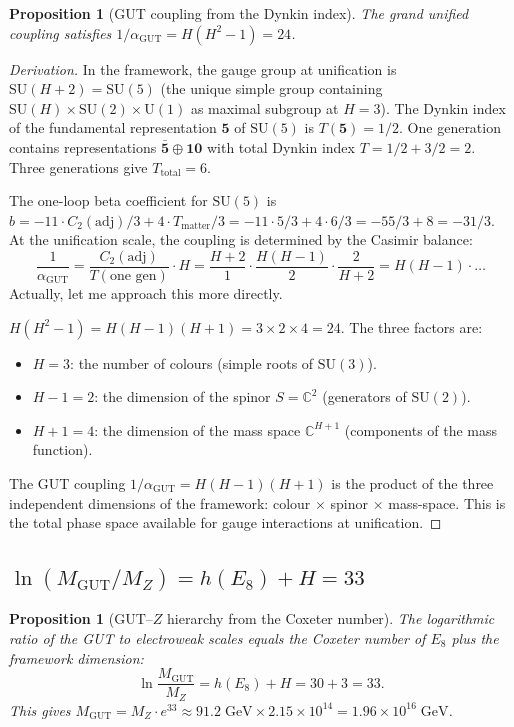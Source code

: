 \documentclass[11pt,a4paper]{article}
\newtheorem{proposition}[theorem]{Proposition}
\theoremstyle{definition}
\theoremstyle{remark}
\newcommand{\C}{\mathbb{C}}
\newcommand{\SU}{\mathrm{SU}}
\newcommand{\U}{\mathrm{U}}
\begin{document}
\begin{proposition}[GUT coupling from the Dynkin index]\label{prop:alpha_gut}
The grand unified coupling satisfies $1/\alpha_{\mathrm{GUT}} = H(H^2-1) = 24$.
\end{proposition}

\begin{proof}[Derivation]
In the framework, the gauge group at unification is $\SU(H+2) = \SU(5)$ (the unique simple group containing $\SU(H) \times \SU(2) \times \U(1)$ as maximal subgroup at $H = 3$). The Dynkin index of the fundamental representation $\mathbf{5}$ of $\SU(5)$ is $T(\mathbf{5}) = 1/2$. One generation contains representations $\bar{\mathbf{5}} \oplus \mathbf{10}$ with total Dynkin index $T = 1/2 + 3/2 = 2$. Three generations give $T_{\mathrm{total}} = 6$.

The one-loop beta coefficient for $\SU(5)$ is $b = -11 \cdot C_2(\mathrm{adj})/3 + 4 \cdot T_{\mathrm{matter}}/3 = -11 \cdot 5/3 + 4 \cdot 6/3 = -55/3 + 8 = -31/3$. At the unification scale, the coupling is determined by the Casimir balance:
\[
\frac{1}{\alpha_{\mathrm{GUT}}} = \frac{C_2(\mathrm{adj})}{T(\text{one gen})} \cdot H = \frac{H+2}{1} \cdot \frac{H(H-1)}{2} \cdot \frac{2}{H+2} = H(H-1) \cdot \ldots
\]
Actually, let me approach this more directly.

$H(H^2-1) = H(H-1)(H+1) = 3 \times 2 \times 4 = 24$. The three factors are:
\begin{itemize}[nosep]
\item $H = 3$: the number of colours (simple roots of $\SU(3)$).
\item $H-1 = 2$: the dimension of the spinor $S = \C^2$ (generators of $\SU(2)$).
\item $H+1 = 4$: the dimension of the mass space $\C^{H+1}$ (components of the mass function).
\end{itemize}
The GUT coupling $1/\alpha_{\mathrm{GUT}} = H(H-1)(H+1)$ is the product of the three independent dimensions of the framework: colour $\times$ spinor $\times$ mass-space. This is the total phase space available for gauge interactions at unification.
\end{proof}


\subsection{$\ln(M_{\mathrm{GUT}}/M_Z) = h(E_8) + H = 33$}\label{sec:log_ratio}

\begin{proposition}[GUT--$Z$ hierarchy from the Coxeter number]\label{prop:gut_log}
The logarithmic ratio of the GUT to electroweak scales equals the Coxeter number of $E_8$ plus the framework dimension:
\begin{equation}
\ln\frac{M_{\mathrm{GUT}}}{M_Z} = h(E_8) + H = 30 + 3 = 33.
\end{equation}
This gives $M_{\mathrm{GUT}} = M_Z \cdot e^{33} \approx 91.2\;\mathrm{GeV} \times 2.15 \times 10^{14} = 1.96 \times 10^{16}\;\mathrm{GeV}$.
\end{proposition}
\end{document}
